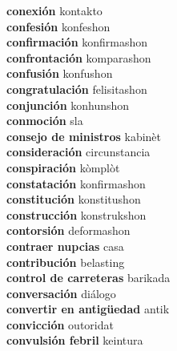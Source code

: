 \textbf{ conexión  } kontakto \\
\textbf{ confesión  } konfeshon \\
\textbf{ confirmación  } konfirmashon \\
\textbf{ confrontación  } komparashon \\
\textbf{ confusión  } konfushon \\
\textbf{ congratulación  } felisitashon \\
\textbf{ conjunción  } konhunshon \\
\textbf{ conmoción  } sla \\
\textbf{ consejo de ministros  } kabinèt \\
\textbf{ consideración  } circunstancia \\
\textbf{ conspiración  } kòmplòt \\
\textbf{ constatación  } konfirmashon \\
\textbf{ constitución  } konstitushon \\
\textbf{ construcción  } konstrukshon \\
\textbf{ contorsión  } deformashon \\
\textbf{ contraer nupcias  } casa \\
\textbf{ contribución  } belasting \\
\textbf{ control de carreteras  } barikada \\
\textbf{ conversación  } diálogo \\
\textbf{ convertir en antigüedad  } antik \\
\textbf{ convicción  } outoridat \\
\textbf{ convulsión febril  } keintura \\
